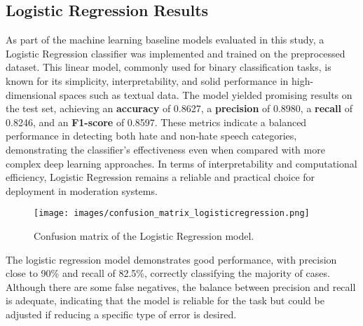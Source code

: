 \subsection{Logistic Regression Results}
\label{sec:logistic_regression_results}

As part of the machine learning baseline models evaluated in this study, a Logistic Regression classifier was implemented and trained on the preprocessed dataset. This linear model, commonly used for binary classification tasks, is known for its simplicity, interpretability, and solid performance in high-dimensional spaces such as textual data. The model yielded promising results on the test set, achieving an \textbf{accuracy} of 0.8627, a \textbf{precision} of 0.8980, a \textbf{recall} of 0.8246, and an \textbf{F1-score} of 0.8597. These metrics indicate a balanced performance in detecting both hate and non-hate speech categories, demonstrating the classifier's effectiveness even when compared with more complex deep learning approaches. In terms of interpretability and computational efficiency, Logistic Regression remains a reliable and practical choice for deployment in moderation systems.

\begin{figure}[H]
    \centering
    \texttt{[image: images/confusion\_matrix\_logisticregression.png]} 
    \caption{Confusion matrix of the Logistic Regression model.}
    \label{fig:confusion_matrix_logistic_regression}
\end{figure}

The logistic regression model demonstrates good performance, with precision close to 90\% and recall of 82.5\%, correctly classifying the majority of cases. Although there are some false negatives, the balance between precision and recall is adequate, indicating that the model is reliable for the task but could be adjusted if reducing a specific type of error is desired.

